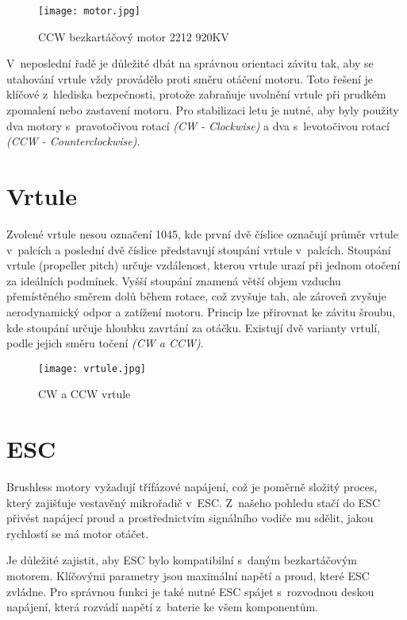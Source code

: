 \documentclass[12pt]{report}
\begin{document}
\begin{figure}[H]
	\centering
	\texttt{[image: motor.jpg]}
	\caption{CCW bezkartáčový motor 2212 920KV}
	\label{fig:motor.jpg}
\end{figure}

V~neposlední řadě je důležité dbát na správnou orientaci závitu tak, aby se utahování vrtule vždy provádělo proti směru otáčení motoru. Toto řešení je klíčové z~hlediska bezpečnosti, protože zabraňuje uvolnění vrtule při prudkém zpomalení nebo zastavení motoru. Pro stabilizaci letu je nutné, aby byly použity dva motory s~pravotočivou rotací \textit{(CW - Clockwise)} a dva s~levotočivou rotací \textit{(CCW - Counterclockwise)}. \cite{ol}

\section[Vrtule]{Vrtule}
Zvolené vrtule nesou označení 1045, kde první dvě číslice označují průměr vrtule v~palcích a poslední dvě číslice představují stoupání vrtule v~palcích. Stoupání vrtule (propeller pitch) určuje vzdálenost, kterou vrtule urazí při jednom otočení za ideálních podmínek. Vyšší stoupání znamená větší objem vzduchu přemístěného směrem dolů během rotace, což zvyšuje tah, ale zároveň zvyšuje aerodynamický odpor a zatížení motoru. Princip lze přirovnat ke závitu šroubu, kde stoupání určuje hloubku zavrtání za otáčku. Existují dvě varianty vrtulí, podle jejich směru točení \textit{(CW a CCW)}.

\begin{figure}[H]
	\centering
	\texttt{[image: vrtule.jpg]}
	\caption{CW a CCW vrtule}
	\label{fig:motor.jpg}
\end{figure}

\section[ESC]{ESC}
Brushless motory vyžadují třífázové napájení, což je poměrně složitý proces, který zajišťuje vestavěný mikrořadič v~ESC. Z~našeho pohledu stačí do ESC přivést napájecí proud a prostřednictvím signálního vodiče mu sdělit, jakou rychlostí se má motor otáčet.

Je důležité zajistit, aby ESC bylo kompatibilní s~daným bezkartáčovým motorem. Klíčovými parametry jsou maximální napětí a proud, které ESC zvládne. Pro správnou funkci je také nutné ESC spájet s~rozvodnou deskou napájení, která rozvádí napětí z~baterie ke všem komponentům.
\end{document}
